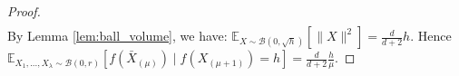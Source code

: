 \begin{proof}
\begin{align*}
\end{align*}
By Lemma \ref{lem:ball_volume}, we have: 
$\mathbb{E}_{X\sim\mathcal{B}(0,\sqrt{h})}\left[\lVert X\rVert ^2\right]=\frac{d}{d+2}h$.
Hence ~ 
 $\mathbb{E}_{X_1,...,X_\lambda\sim\mathcal{B}(0,r)}\left[f\left(\bar{X}_{(\mu)}\right)\mid f(X_{(\mu+1)})=h\right]= \frac{d}{d+2}\frac{h}{\mu}.$
\end{proof}
